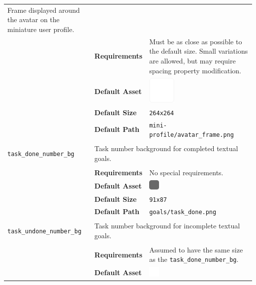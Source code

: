 \documentclass[a4paper, 10pt]{report}
\begin{document}
\begin{longtable}{| p{} p{} p{}|}
{    Frame displayed around the avatar on the miniature user profile.
  }\\
  & \textbf{Requirements} & Must be as close as possible to the default size. Small variations are allowed, but may require spacing property modification.\\
  & \textbf{Default Asset} & \centering\arraybackslash\includegraphics[width=0.25\textwidth, valign=m]{../base/assets/mini-profile/avatar_frame.png}\\
  & \textbf{Default Size} & \texttt{264x264}\\
  & \textbf{Default Path} & \texttt{mini-profile/avatar\_frame.png}\\[2ex]
  \hypertarget{weeklygoals-task-done-number-bg}{\texttt{task\_done\_number\_bg}} & \multicolumn{2}{p{.70\textwidth+2\tabcolsep}|}{
    Task number background for completed textual goals.
  }\\
  & \textbf{Requirements} & No special requirements.\\
  & \textbf{Default Asset} & \centering\arraybackslash\includegraphics[width=0.1\textwidth, valign=m]{../base/assets/goals/task_done.png}\\
  & \textbf{Default Size} & \texttt{91x87}\\
  & \textbf{Default Path} & \texttt{goals/task\_done.png}\\[2ex]
  \hypertarget{weeklygoals-task-undone-number-bg}{\texttt{task\_undone\_number\_bg}} & \multicolumn{2}{p{.70\textwidth+2\tabcolsep}|}{
    Task number background for incomplete textual goals.
  }\\
  & \textbf{Requirements} & Assumed to have the same size as the \texttt{task\_done\_number\_bg}.\\
  & \textbf{Default Asset} & \centering\arraybackslash\includegraphics[width=0.1\textwidth, valign=m]{../base/assets/goals/task_undone.png}\\

\end{longtable}
\end{document}
